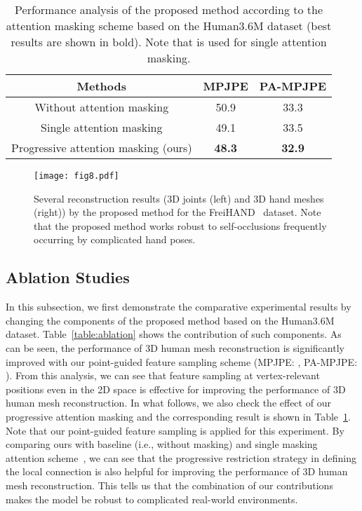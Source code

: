 \documentclass[10pt,twocolumn,letterpaper]{article}
\begin{document}
\begin{table}[t]
\small
\begin{center}
\begin{tabular}{c|c|c}
\hline
Methods & {MPJPE} & {PA-MPJPE} \\
\hline
\hline
Without attention masking & 50.9 & 33.3 \\
Single attention masking & 49.1 & 33.5 \\
Progressive attention masking (ours) & \textbf{48.3} & \textbf{32.9} \\
\hline
\end{tabular}
\caption{\label{table:ablation2}Performance analysis of the proposed method according to the attention masking scheme based on the Human3.6M dataset (best results are shown in bold). Note that  is used for single attention masking.}

\end{center}

\end{table}


\begin{figure*}[t]
\vspace{-4mm}

\centerline{\texttt{[image: fig8.pdf]}}
\caption{\label{fig:hand_results}
Several reconstruction results (3D joints (left) and 3D hand meshes (right)) by the proposed method for the FreiHAND~\cite{Zimmermann19} dataset. Note that the proposed method works robust to self-occlusions frequently occurring by complicated hand poses.}
\end{figure*}


\subsection{Ablation Studies}
In this subsection, we first demonstrate the comparative experimental results by changing the components of the proposed method based on the Human3.6M dataset. Table~\ref{table:ablation} shows the contribution of such components. As can be seen, the performance of 3D human mesh reconstruction is significantly improved with our point-guided feature sampling scheme (MPJPE: , PA-MPJPE: ). From this analysis, we can see that feature sampling at vertex-relevant positions even in the 2D space is effective for improving the performance of 3D human mesh reconstruction. In what follows, we also check the effect of our progressive attention masking and the corresponding result is shown in Table~\ref{table:ablation2}. Note that our point-guided feature sampling is applied for this experiment. By comparing ours with baseline (i.e., without masking) and single masking attention scheme~\cite{Cho22}, we can see that the progressive restriction strategy in defining the local connection is also helpful for improving the performance of 3D human mesh reconstruction. This tells us that the combination of our contributions makes the model be robust to complicated real-world environments. 
\end{document}
